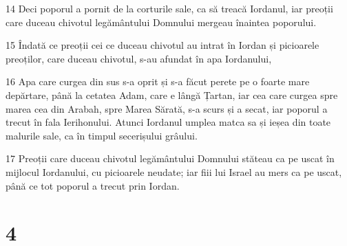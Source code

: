 \par 14 Deci poporul a pornit de la corturile sale, ca să treacă Iordanul, iar preoții care duceau chivotul legământului Domnului mergeau înaintea poporului.
\par 15 Îndată ce preoții cei ce duceau chivotul au intrat în Iordan și picioarele preoților, care duceau chivotul, s-au afundat în apa Iordanului,
\par 16 Apa care curgea din sus s-a oprit și s-a făcut perete pe o foarte mare depărtare, până la cetatea Adam, care e lângă Țartan, iar cea care curgea spre marea cea din Arabah, spre Marea Sărată, s-a scurs și a secat, iar poporul a trecut în fala Ierihonului. Atunci Iordanul umplea matca sa și ieșea din toate malurile sale, ca în timpul secerișului grâului.
\par 17 Preoții care duceau chivotul legământului Domnului stăteau ca pe uscat în mijlocul Iordanului, cu picioarele neudate; iar fiii lui Israel au mers ca pe uscat, până ce tot poporul a trecut prin Iordan.

\chapter{4}

